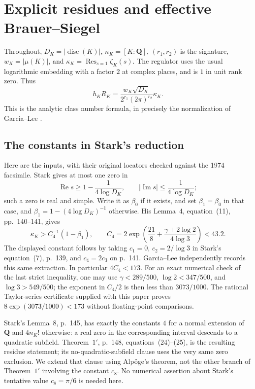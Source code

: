 \section{Explicit residues and effective Brauer--Siegel}
\label{sec:normal}

Throughout, $D_K=|\operatorname{disc}(K)|$, $n_K=[K:\mathbf Q]$,
$(r_1,r_2)$ is the signature, $w_K=|\mu(K)|$, and
$\kappa_K=\operatorname*{Res}_{s=1}\zeta_K(s)$.
The regulator uses the usual logarithmic embedding with a factor $2$
at complex places, and is $1$ in unit rank zero. Thus
\begin{equation}\label{eq:classformula}
 h_KR_K=\frac{w_K\sqrt{D_K}}{2^{r_1}(2\pi)^{r_2}}\kappa_K.
\end{equation}
This is the analytic class number formula, in precisely the normalization
of Garcia--Lee \cite[(1), p.~2]{GarciaLee}.

\subsection{The constants in Stark's reduction}

Here are the inputs, with their original locators checked against the
1974 facsimile. Stark \cite[Lemma~3, pp.~139--140]{Stark} gives at most one
zero in
\[
 \operatorname{Re}s\geq1-\frac1{4\log D_K},\qquad
 |\operatorname{Im}s|\leq\frac1{4\log D_K};
\]
such a zero is real and simple. Write it as $\beta_0$ if it exists, and
set $\beta_1=\beta_0$ in that case, and
$\beta_1=1-(4\log D_K)^{-1}$ otherwise. His Lemma~4, equation~(11),
pp.~140--141, gives
\begin{equation}\label{eq:stark-residue}
 \kappa_K>C_4^{-1}(1-\beta_1),\qquad
 C_4=2\exp\left(\frac{21}{8}
                 +\frac{\gamma+2\log2}{4\log3}\right)<43.2.
\end{equation}
The displayed constant follows by taking $c_1=0$, $c_2=2/\log3$ in
Stark's equation~(7), p.~139, and $c_4=2c_3$ on p.~141.
Garcia--Lee \cite[\S3, pp.~16--17]{GarciaLee} independently records this
same extraction. In particular $4C_4<173$.
For an exact numerical check of the last strict inequality, one may use
$\gamma<289/500$, $\log2<347/500$, and $\log3>549/500$;
the exponent in $C_4/2$ is then less than $3073/1000$.
The rational Taylor-series certificate supplied with this paper proves
$8\exp(3073/1000)<173$ without floating-point comparisons.

Stark's Lemma~8, p.~145, has exactly the constants $4$ for a normal
extension of $\mathbf Q$ and $4n_K!$ otherwise: a real zero in the
corresponding interval descends to a quadratic subfield. Theorem~$1'$,
p.~148, equations~(24)--(25), is the resulting residue statement;
its no-quadratic-subfield clause uses the very same zero exclusion.
We extend that clause using Alp\"oge's theorem, not the other branch of
Theorem~$1'$ involving the constant $c_8$. No numerical assertion about
Stark's tentative value $c_8=\pi/6$ is needed here.

